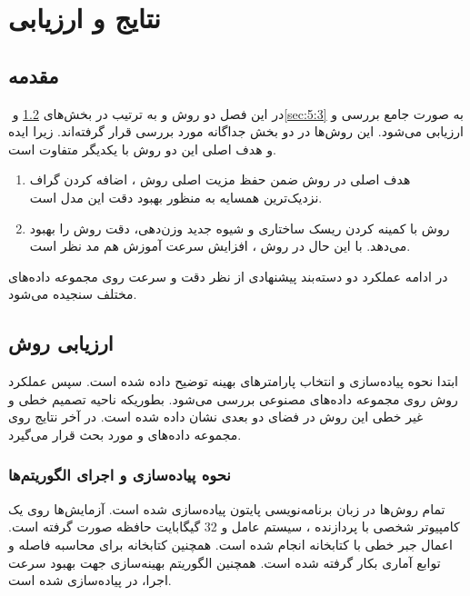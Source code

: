 
\chapter{نتایج و ارزیابی}\label{ch:5}
\section{مقدمه}\label{sec:5:1}
در این فصل دو روش  و  به ترتیب در بخش‌های ‏\ref{sec:5:2} و ‏\ref{sec:5:3} به صورت جامع بررسی و ارزیابی می‌شود. این روش‌ها در دو بخش جداگانه مورد بررسی قرار گرفته‌اند. زیرا ایده و هدف اصلی این دو روش با یکدیگر متفاوت است. 
\begin{enumerate}
	\item هدف اصلی در روش  ضمن حفظ مزیت اصلی روش ، اضافه کردن گراف نزدیک‌ترین همسایه به منظور بهبود دقت این مدل است.
	\item 	روش  با کمینه کردن ریسک ساختاری و شیوه جدید وزن‌دهی، دقت روش  را بهبود می‌دهد. با این حال در روش ، افزایش سرعت آموزش هم مد نظر است.
\end{enumerate}

در ادامه عملکرد دو دسته‌بند پیشنهادی از نظر دقت و سرعت روی مجموعه داده‌های مختلف سنجیده می‌شود.

\section{ارزیابی روش }\label{sec:5:2}
ابتدا نحوه پیاده‌سازی و انتخاب پارامترهای بهینه توضیح داده شده است. سپس عملکرد روش  روی مجموعه داده‌های مصنوعی بررسی می‌شود. بطوریکه ناحیه تصمیم خطی و غیر خطی این روش در فضای دو بعدی نشان داده شده است. در آخر نتایج روی مجموعه داده‌های  و  مورد بحث قرار می‌گیرد.

\subsection{نحوه پیاده‌سازی و اجرای الگوریتم‌ها}\label{sec:5:2:1}
تمام روش‌ها در زبان برنامه‌نویسی پایتون  \cite{ceder2010} پیاده‌سازی شده است. آزمایش‌ها روی یک کامپیوتر شخصی با پردازنده ، سیستم عامل  و 32 گیگابایت حافظه صورت گرفته است. اعمال جبر خطی با کتابخانه  \cite{walt2011} انجام شده است. همچنین کتابخانه  \cite{jones2014} برای محاسبه فاصله و توابع آماری بکار گرفته شده است. همچنین الگوریتم بهینه‌سازی  جهت بهبود سرعت اجرا، در  \cite{behnel2011} پیاده‌سازی شده است.


